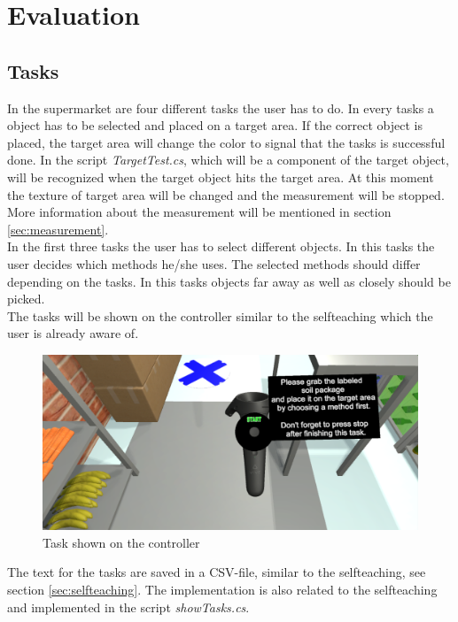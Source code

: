 \section{Evaluation} \label{sec:evaluation}

\subsection{Tasks} \label{sec:tasks}
In the supermarket are four different tasks the user has to do. In every tasks a object has to be selected and placed on a target area. If the correct object is placed, the target area will change the color to signal that the tasks is successful done. In the script \textit{TargetTest.cs}, which will be a component of the target object, will be recognized when the target object hits the target area. At this moment the texture of target area will be changed and the measurement will be stopped. More information about the measurement will be mentioned in section \ref{sec:measurement}.\\
In the first three tasks the user has to select different objects. In this tasks the user decides which methods he/she uses. The selected methods should differ depending on the tasks. In this tasks  objects far away as well as closely should be picked. \\
The tasks will be shown on the controller similar to the selfteaching which the user is already aware of. 

\begin{figure}[H] 
	\center 
	\includegraphics[width=12cm]{Images/TaskContreoller.PNG}
	\caption[Task shown on the controller]{Task shown on the controller}
	\label{fig:taskC}
\end{figure} 

The text for the tasks are saved in a CSV-file, similar to the selfteaching, see section \ref{sec:selfteaching}. The implementation is also related to the selfteaching and implemented in the script \textit{showTasks.cs}.

